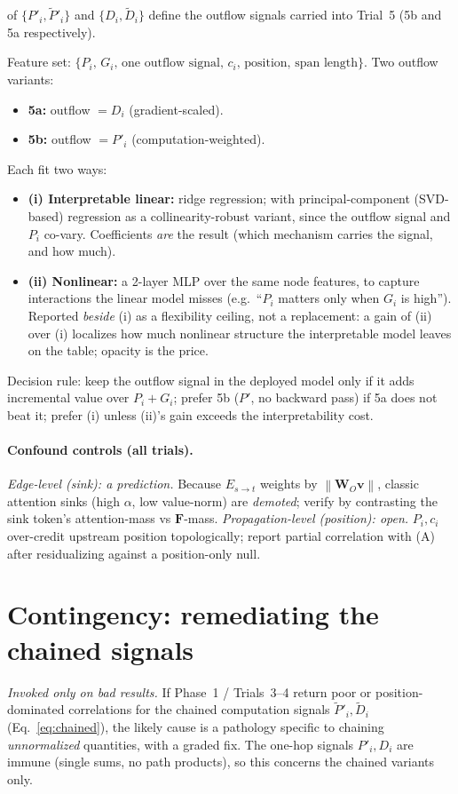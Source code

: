 \documentclass[11pt]{article}
\newcommand{\F}{\mathbf{F}}
\newcommand{\WO}{\mathbf{W}_O}
\newcommand{\vv}{\mathbf{v}}
\newcommand{\norm}[1]{\left\lVert #1 \right\rVert}
\begin{document}
\begin{description}[leftmargin=0pt,itemsep=4pt]
of $\{P'_i,\widetilde P'_i\}$ and $\{D_i,\widetilde D_i\}$ define the outflow signals carried into
Trial~5 (5b and 5a respectively).
\item[\textbf{Trial 5 --- Combination.}] Feature set: $\{P_i,\,G_i,\,\text{one outflow signal},\,c_i,\,
\text{position},\,\text{span length}\}$. Two outflow variants:
  \begin{itemize}[leftmargin=1.4em,itemsep=1pt]
  \item \textbf{5a:} outflow $=D_i$ (gradient-scaled).
  \item \textbf{5b:} outflow $=P'_i$ (computation-weighted).
  \end{itemize}
  Each fit two ways:
  \begin{itemize}[leftmargin=1.4em,itemsep=1pt]
  \item \textbf{(i) Interpretable linear:} ridge regression; with principal-component (SVD-based)
  regression as a collinearity-robust variant, since the outflow signal and $P_i$ co-vary. Coefficients
  \emph{are} the result (which mechanism carries the signal, and how much).
  \item \textbf{(ii) Nonlinear:} a 2-layer MLP over the same node features, to capture interactions the
  linear model misses (e.g.\ ``$P_i$ matters only when $G_i$ is high''). Reported \emph{beside} (i) as
  a flexibility ceiling, not a replacement: a gain of (ii) over (i) localizes how much nonlinear
  structure the interpretable model leaves on the table; opacity is the price.
  \end{itemize}
  Decision rule: keep the outflow signal in the deployed model only if it adds incremental value over
  $P_i+G_i$; prefer 5b ($P'$, no backward pass) if 5a does not beat it; prefer (i) unless (ii)'s gain
  exceeds the interpretability cost.
\end{description}

\paragraph{Confound controls (all trials).}
\emph{Edge-level (sink): a prediction.} Because $E_{s\to t}$ weights by $\norm{\WO\vv}$, classic
attention sinks (high $\alpha$, low value-norm) are \emph{demoted}; verify by contrasting the sink
token's attention-mass vs $\F$-mass. \emph{Propagation-level (position): open.} $P_i,c_i$ over-credit
upstream position topologically; report partial correlation with (A) after residualizing against a
position-only null.

\section{Contingency: remediating the chained signals}
\label{sec:contingency}
\emph{Invoked only on bad results.} If Phase~1 / Trials~3--4 return poor or position-dominated
correlations for the chained computation signals $\widetilde P'_i,\widetilde D_i$
(Eq.~\ref{eq:chained}), the likely cause is a pathology specific to chaining \emph{unnormalized}
quantities, with a graded fix. The one-hop signals $P'_i,D_i$ are immune (single sums, no path
products), so this concerns the chained variants only.
\end{document}
